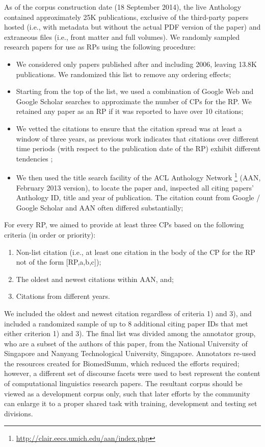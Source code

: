 \documentclass[11pt]{article}
\begin{document}
As of the corpus construction date (18 September 2014), the live
Anthology contained approximately 25K publications, exclusive of the
third-party papers hosted (i.e., with metadata but without the actual
PDF version of the paper) and extraneous files (i.e., front matter and
full volumes). We randomly sampled research papers for use as RPs
using the following procedure:
\begin{itemize}
\item{We considered only papers published after and including 2006,
  leaving 13.8K publications. We randomized this list to remove any
  ordering effects;}
\vspace{-.3cm}
\item{Starting from the top of the list, we used a combination of
  Google Web and Google Scholar searches to approximate the number of
  CPs for the RP.  We retained any paper as an RP if it was reported
  to have over 10 citations;}
\vspace{-.3cm}
\item{We vetted the citations to ensure that the citation spread was at least a 
window of three years, as previous work indicates that citations over different 
time periods (with respect to the publication date of the RP) exhibit different 
tendencies \cite{N13-1067};}
\vspace{-.3cm}
\item{We then used the title search facility of the ACL Anthology Network
\footnote{\url{http://clair.eecs.umich.edu/aan/index.php}} (AAN, February 2013 version), 
  to locate the paper and, inspected all citing papers' Anthology ID, title and year of
  publication. The citation count from Google / Google Scholar and AAN often differed 
  substantially;}
\end{itemize}
For every RP, we aimed to provide at least three CPs based on the following 
criteria (in order or priority):
\begin{enumerate}
\item Non-list citation (i.e., at least one citation in the body of
  the CP for the RP not of the form [RP,a,b,c]);
\item The oldest and newest citations within AAN, and;
\vspace{-.3cm}
\item Citations from different years. 
\end{enumerate}

We included the oldest and newest citation regardless of criteria 1)
and 3), and included a randomized sample of up to 8 additional citing
paper IDs that met either criterion 1) and 3). The final list was
divided among the annotator group, who are a subset of the authors of
this paper, from the National University of Singapore and Nanyang
Technological University, Singapore. Annotators re-used the resources
created for BiomedSumm, which reduced the efforts required; however, a
different set of discourse facets were used to best represent the
content of computational linguistics research papers.  The resultant
corpus should be viewed as a development corpus only, such that later
efforts by the community can enlarge it to a proper shared task with
training, development and testing set divisions.
\end{document}
